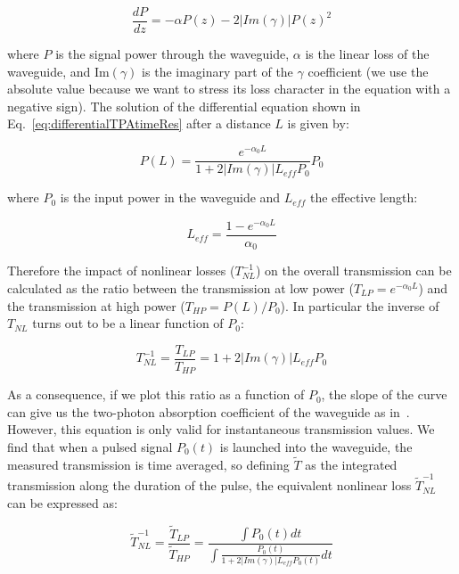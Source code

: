 \begin{equation}
\frac{dP}{dz} = -\alpha P(z) - 2|Im(\gamma)| P(z)^2 
\label{eq:differentialTPAtimeRes}
\end{equation}

where $P$ is the signal power through the waveguide, $\alpha$ is the linear loss of the waveguide, and Im$(\gamma)$ is the imaginary part of the $\gamma$ coefficient (we use the absolute value because we want to stress its loss character in the equation with a negative sign). 
The solution of the differential equation shown in Eq.~\ref{eq:differentialTPAtimeRes} after a distance $L$ is given by:

\begin{equation}
P(L) = \frac{e^{-\alpha_0 L}}{1+2|Im(\gamma)| L_{eff} P_0} P_0
\end{equation}

where $P_0$ is the input power in the waveguide and $ L_{eff} $ the effective length:

\begin{equation}
L_{eff} = \frac{1-e^{-\alpha_0L}}{\alpha_0}
\end{equation}


Therefore the impact of nonlinear losses ($T_{NL}^{-1}$) on the overall transmission can be calculated as the ratio between the transmission at low power ($T_{LP} = e^{-\alpha_0 L} $) and the transmission at high power ($T_{HP} = P(L)/P_0 $). In particular the inverse of $T_{NL}$ turns out to be a linear function of $P_0$:

\begin{equation}
T_{NL}^{-1} = \frac{T_{LP}}{T_{HP}} = 1+2|Im(\gamma)| L_{eff} P_0
\label{eq:transmissionLinearTimeRes}
\end{equation}

As a consequence, if we plot this ratio as a function of $P_0$, the slope of the curve can give us the two-photon absorption coefficient of the waveguide as in~\cite{Vallaitis2009}.
However, this equation is only valid for instantaneous transmission values.
We find that when a pulsed signal $P_0(t)$ is launched into the waveguide, the measured transmission is time averaged, so defining $ \tilde{T} $ as the integrated transmission along the duration of the pulse, the equivalent nonlinear loss $\tilde{T}_{NL}^{-1}$ can be expressed as:

                                                                \begin{equation}
                                                                        \tilde{T}_{NL}^{-1} = \frac{\tilde{T}_{LP}}{\tilde{T}_{HP}} = \frac{\int P_0(t)dt}{\int \frac{P_0(t)}{1+2|Im(\gamma)| L_{eff} P_0(t)} dt}
                                                                        \label{eq:transmissionIntegralTimeRes}
                                                                \end{equation}

